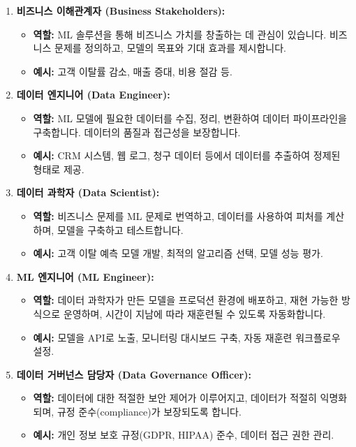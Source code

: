 \documentclass[11pt,a4paper]{article}
\theoremstyle{definition}
\begin{document}
\begin{enumerate}
    \item \textbf{비즈니스 이해관계자 (Business Stakeholders):}
    \begin{itemize}
        \item \textbf{역할:} ML 솔루션을 통해 비즈니스 가치를 창출하는 데 관심이 있습니다. 비즈니스 문제를 정의하고, 모델의 목표와 기대 효과를 제시합니다.
        \item \textbf{예시:} 고객 이탈률 감소, 매출 증대, 비용 절감 등.
    \end{itemize}

    \item \textbf{데이터 엔지니어 (Data Engineer):}
    \begin{itemize}
        \item \textbf{역할:} ML 모델에 필요한 데이터를 수집, 정리, 변환하여 데이터 파이프라인을 구축합니다. 데이터의 품질과 접근성을 보장합니다.
        \item \textbf{예시:} CRM 시스템, 웹 로그, 청구 데이터 등에서 데이터를 추출하여 정제된 형태로 제공.
    \end{itemize}

    \item \textbf{데이터 과학자 (Data Scientist):}
    \begin{itemize}
        \item \textbf{역할:} 비즈니스 문제를 ML 문제로 번역하고, 데이터를 사용하여 피처를 계산하며, 모델을 구축하고 테스트합니다.
        \item \textbf{예시:} 고객 이탈 예측 모델 개발, 최적의 알고리즘 선택, 모델 성능 평가.
    \end{itemize}

    \item \textbf{ML 엔지니어 (ML Engineer):}
    \begin{itemize}
        \item \textbf{역할:} 데이터 과학자가 만든 모델을 프로덕션 환경에 배포하고, 재현 가능한 방식으로 운영하며, 시간이 지남에 따라 재훈련될 수 있도록 자동화합니다.
        \item \textbf{예시:} 모델을 API로 노출, 모니터링 대시보드 구축, 자동 재훈련 워크플로우 설정.
    \end{itemize}

    \item \textbf{데이터 거버넌스 담당자 (Data Governance Officer):}
    \begin{itemize}
        \item \textbf{역할:} 데이터에 대한 적절한 보안 제어가 이루어지고, 데이터가 적절히 익명화되며, 규정 준수(compliance)가 보장되도록 합니다.
        \item \textbf{예시:} 개인 정보 보호 규정(GDPR, HIPAA) 준수, 데이터 접근 권한 관리.
    \end{itemize}
\end{enumerate}
\end{document}

